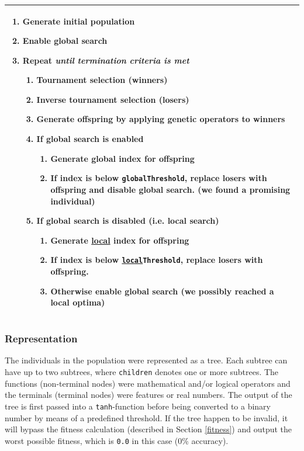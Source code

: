 \documentclass{article}
\begin{document}
\begin{table}[H]
\centering
\begin{tabularx}{\textwidth}{X}
\hline
\begin{enumerate}[label=\arabic*.]
  \item Generate initial population
  \item \textbf{Enable global search}
  \item Repeat \emph{until termination criteria is met}
  \begin{enumerate}[label*=\arabic*.]
    \item Tournament selection (winners)
    \item Inverse tournament selection (losers)
    \item Generate offspring by applying genetic operators to winners
    \item \textbf{If global search is enabled}
    \begin{enumerate}[label*=\arabic*.]
      \item \textbf{Generate global index for offspring}
      \item \textbf{If index is below \texttt{globalThreshold}, replace losers with offspring and disable global search.} (we found a promising individual)
    \end{enumerate}
    \item \textbf{If global search is disabled} (i.e. local search)
    \begin{enumerate}[label*=\arabic*.]
      \item \textbf{Generate \underline{local} index for offspring}
      \item \textbf{If index is below \texttt{\underline{local}Threshold}, replace losers with offspring.} 
      \item \textbf{Otherwise enable global search} (we possibly reached a local optima)
    \end{enumerate}
  \end{enumerate}
\end{enumerate} \\
\hline
\end{tabularx}
\end{table}

\subsubsection{Representation}
The individuals in the population were represented as a tree. Each subtree can have up to two subtrees, where \texttt{children} denotes one or more subtrees. The functions (non-terminal nodes) were mathematical and/or logical operators and the terminals (terminal nodes) were features or real numbers. The output of the tree is first passed into a \texttt{tanh}-function before being converted to a binary number by means of a predefined threshold. If the tree happen to be invalid, it will bypass the fitness calculation (described in Section \ref{fitness}) and output the worst possible fitness, which is \texttt{0.0} in this case (0\% accuracy).
\end{document}
